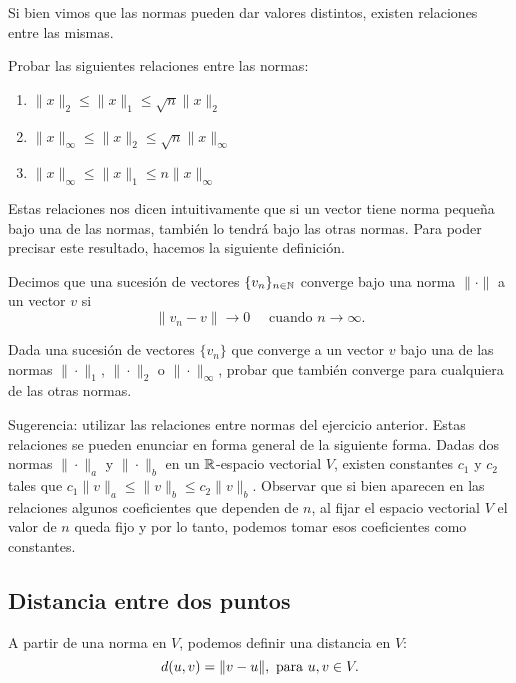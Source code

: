 Si bien vimos que las normas pueden dar valores distintos, existen relaciones entre las mismas.

\begin{ejercicio}
Probar las siguientes relaciones entre las normas:
\begin{enumerate}
\item $\|x\|_2 \le \|x\|_1 \le \sqrt{n} \|x\|_2$
\item $\|x\|_\infty \le \|x\|_2 \le \sqrt{n} \|x\|_\infty$
\item $\|x\|_\infty \le \|x\|_1 \le n \|x\|_\infty$
\end{enumerate}
\end{ejercicio}

Estas relaciones nos dicen intuitivamente que si un vector tiene norma pequeña bajo una de las normas, tambi\'en lo tendr\'a bajo las otras normas. Para poder precisar este resultado, hacemos la siguiente definici\'on.

\begin{defi}
Decimos que una sucesi\'on de vectores $\{v_n\}_{n \in \mathbb N}$ converge bajo una norma $\|\cdot\|$ a un vector $v$ si
$$
\|v_n - v\| \rightarrow 0 \quad \text{ cuando } n \rightarrow \infty.
$$
\end{defi}

\begin{ejercicio}
Dada una sucesi\'on de vectores $\{v_n\}$ que converge a un vector $v$ bajo una de las normas $\|\cdot\|_1$, $\|\cdot\|_2$ o $\|\cdot\|_\infty$, probar que tambi\'en converge para cualquiera de las otras normas.
\end{ejercicio}

Sugerencia: utilizar las relaciones entre normas del ejercicio anterior. Estas relaciones se pueden enunciar en forma general de la siguiente forma. Dadas dos normas $\|\cdot\|_a$ y $\|\cdot\|_b$ en un $\mathbb R$-espacio vectorial $V$, existen constantes $c_1$ y $c_2$ tales que $c_1 \|v\|_a \le \|v\|_b \le c_2 \|v\|_b$. Observar que si bien aparecen en las relaciones algunos coeficientes que dependen de $n$, al fijar el espacio vectorial $V$ el valor de $n$ queda fijo y por lo tanto, podemos tomar esos coeficientes como constantes.

\subsection{Distancia entre dos puntos}

A partir de una norma en $V$, podemos definir una distancia en $V$:
$$
d(\ub, \vb) = \|\vb - \ub\|, \text{ para } \ub, \vb \in V.
$$

